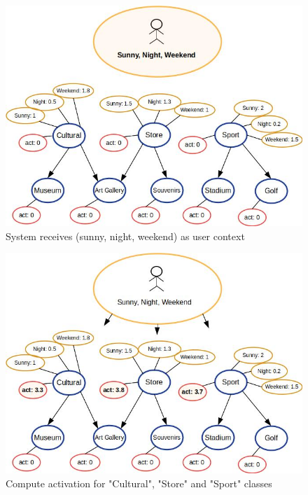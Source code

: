 \begin{figure}[h]
\centering
\includegraphics[scale=0.45]{draws/initial_act.jpg}
\caption{System receives (sunny, night, weekend) as user context}
\label{fig:init_act}
\end{figure}

\begin{figure}[h]
\centering
\includegraphics[scale=0.45]{draws/high_act.jpg}
\caption{Compute activation for "Cultural", "Store" and "Sport" classes}
\label{fig:high_act}
\end{figure}


